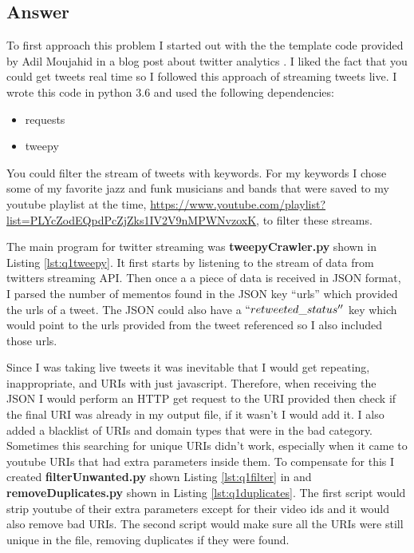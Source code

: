 \documentclass[letterpaper,11pt]{article}
\newcommand*{\srcPath}{../src}%
\begin{document}
\subsection*{Answer}

To first approach this problem I started out with the the template code provided by Adil Moujahid in a blog post about twitter analytics \cite{twitterstreamref}. I liked the fact that you could get tweets real time so I followed this approach of streaming tweets live. I wrote this code in python 3.6 and used the following dependencies:

\begin{itemize}
  \item requests
  \item tweepy
\end{itemize}

You could filter the stream of tweets with keywords. For my keywords I chose some of my favorite jazz and funk musicians and bands that were saved to my youtube playlist at the time, \url{https://www.youtube.com/playlist?list=PLYcZodEQpdPcZjZks1IV2V9nMPWNvzoxK}, to filter these streams.

The main program for twitter streaming was \textbf{tweepyCrawler.py} shown in Listing \ref{lst:q1tweepy}. It first starts by listening to the stream of data from twitters streaming API. Then once a a piece of data is received in JSON format, I parsed the number of mementos found in the JSON key ``urls'' which provided the urls of a tweet. The JSON could also have a $``retweeted\char`_status''$ key which would point to the urls provided from the tweet referenced so I also included those urls.



Since I was taking live tweets it was inevitable that I would get repeating, inappropriate, and URIs with just javascript. Therefore, when receiving the JSON I would perform an HTTP get request to the URI provided then check if the final URI was already in my output file, if it wasn't I would add it. I also added a blacklist of URIs and domain types that were in the bad category. Sometimes this searching for unique URIs didn't work, especially when it came to youtube URIs that had extra parameters inside them. To compensate for this I created \textbf{filterUnwanted.py} shown Listing \ref{lst:q1filter} in and \textbf{removeDuplicates.py} shown in Listing \ref{lst:q1duplicates}. The first script would strip youtube of their extra parameters except for their video ids and it would also remove bad URIs. The second script would make sure all the URIs were still unique in the file, removing duplicates if they were found.
\end{document}
